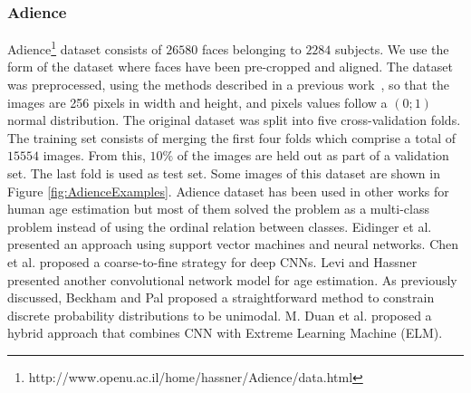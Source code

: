 \documentclass[preprint]{elsarticle}
\begin{document}
\subsubsection{Adience}
Adience\footnote{http://www.openu.ac.il/home/hassner/Adience/data.html} dataset consists of $26580$ faces belonging to $2284$ subjects. We use the form of the dataset where faces have been pre-cropped and aligned. The dataset was preprocessed, using the methods described in a previous work~\cite{beckham2017unimodal}, so that the images are 256 pixels in width and height, and pixels values follow a $(0;1)$ normal distribution. The original dataset was split into five cross-validation folds. The training set consists of merging the first four folds which comprise a total of $15554$ images. From this, $10\%$ of the images are held out as part of a validation set. The last fold is used as test set. Some images of this dataset are shown in Figure \ref{fig:AdienceExamples}. Adience dataset has been used in other works for human age estimation but most of them solved the problem as a multi-class problem instead of using the ordinal relation between classes. Eidinger et al. \cite{eidinger2014age} presented an approach using support vector machines and neural networks. Chen et al. \cite{chen2016cascaded} proposed a coarse-to-fine strategy for deep CNNs. Levi and Hassner \cite{levi2015age} presented another convolutional network model for age estimation. As previously discussed, Beckham and Pal \cite{beckham2017unimodal} proposed a straightforward method to constrain discrete probability distributions to be unimodal. M. Duan et al. \cite{duan2018hybrid} proposed a hybrid approach that combines CNN with Extreme Learning Machine (ELM).
\end{document}
